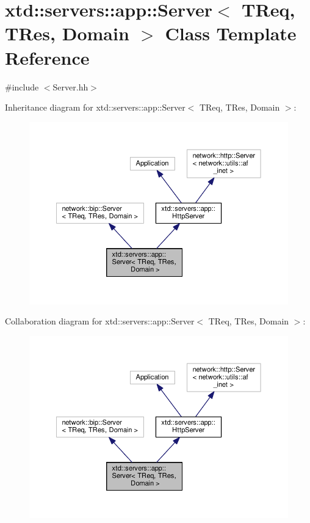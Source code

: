 \hypertarget{classxtd_1_1servers_1_1app_1_1Server}{}\section{xtd\+:\+:servers\+:\+:app\+:\+:Server$<$ T\+Req, T\+Res, Domain $>$ Class Template Reference}
\label{classxtd_1_1servers_1_1app_1_1Server}


{\ttfamily \#include $<$Server.\+hh$>$}



Inheritance diagram for xtd\+:\+:servers\+:\+:app\+:\+:Server$<$ T\+Req, T\+Res, Domain $>$\+:
\nopagebreak
\begin{figure}[H]
\begin{center}
\leavevmode
\includegraphics[width=350pt]{classxtd_1_1servers_1_1app_1_1Server__inherit__graph}
\end{center}
\end{figure}


Collaboration diagram for xtd\+:\+:servers\+:\+:app\+:\+:Server$<$ T\+Req, T\+Res, Domain $>$\+:
\nopagebreak
\begin{figure}[H]
\begin{center}
\leavevmode
\includegraphics[width=350pt]{classxtd_1_1servers_1_1app_1_1Server__coll__graph}
\end{center}
\end{figure}
